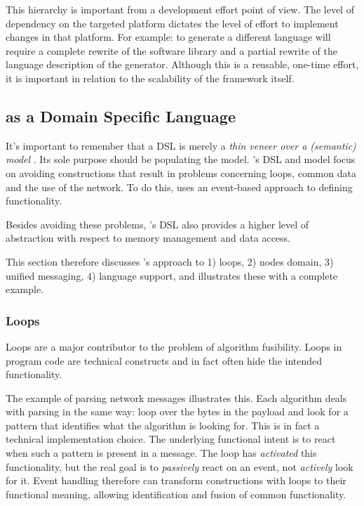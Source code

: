 \documentclass[conference]{IEEEtran}
\begin{document}
This hierarchy is important from a development effort point of view. The level
of dependency on the targeted platform dictates the level of effort to
implement changes in that platform. For example: to generate a different
language will require a complete rewrite of the software library and a partial
rewrite of the language description of the generator. Although this is a
reusable, one-time effort, it is important in relation to the scalability of
the framework itself.

\subsection{\NAME as a Domain Specific Language}
\label{dsl-design}

It's important to remember that a DSL is merely a \emph{thin veneer over a
(semantic) model} \cite{fowler2010domain}. Its sole purpose should be
populating the model. \NAME's DSL and model focus on avoiding constructions
that result in problems concerning loops, common data and the use of the
network. To do this, \NAME uses an event-based approach to defining
functionality.

Besides avoiding these problems, \NAME's DSL also provides a higher level of
abstraction with respect to memory management and data access.

This section therefore discusses \NAME's approach to 1) loops, 2) nodes domain,
3) unified messaging, 4) language support, and illustrates these with a
complete example.

\subsubsection{Loops}

Loops are a major contributor to the problem of algorithm fusibility. Loops in
program code are technical constructs and in fact often hide the intended
functionality.

The example of parsing network messages illustrates this. Each algorithm deals
with parsing in the same way: loop over the bytes in the payload and look for a
pattern that identifies what the algorithm is looking for. This is in fact a
technical implementation choice. The underlying functional intent is to react
when such a pattern is present in a message. The loop has \emph{activated} this
functionality, but the real goal is to \emph{passively} react on an event, not
\emph{actively} look for it. Event handling therefore can transform
constructions with loops to their functional meaning, allowing identification
and fusion of common functionality.
\end{document}
